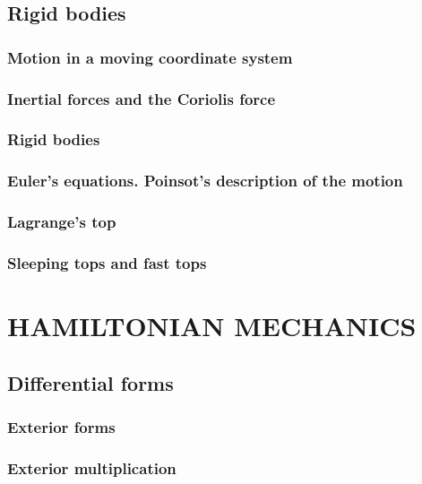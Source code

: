 \documentclass{book}
\numberwithin{equation}{section}
\theoremstyle{plain}
\theoremstyle{definition}
\theoremstyle{remark}
\theoremstyle{remark}
\begin{document}
\chapter{Rigid bodies}

\section{Motion in a moving coordinate system}

\section{Inertial forces and the Coriolis force}

\section{Rigid bodies}

\section{Euler's equations. Poinsot's description of the motion}

\section{Lagrange's top}

\section{Sleeping tops and fast tops}

\part{HAMILTONIAN MECHANICS}

\chapter{Differential forms}

\section{Exterior forms}

\section{Exterior multiplication}
\end{document}
